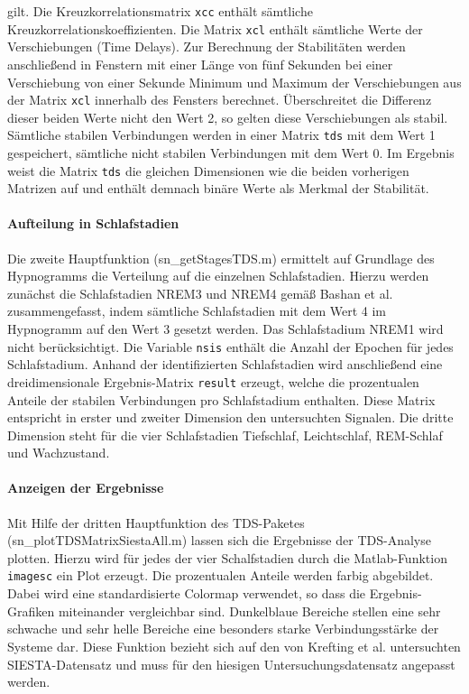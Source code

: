 gilt. Die Kreuzkorrelationsmatrix \texttt{xcc} enthält sämtliche Kreuzkorrelationskoeffizienten. Die Matrix \texttt{xcl} enthält sämtliche Werte der Verschiebungen (Time Delays). Zur Berechnung der Stabilitäten werden anschließend in Fenstern mit einer Länge von fünf Sekunden bei einer Verschiebung von einer Sekunde Minimum und Maximum der Verschiebungen aus der Matrix \texttt{xcl} innerhalb des Fensters berechnet. Überschreitet die Differenz dieser beiden Werte nicht den Wert 2, so gelten diese Verschiebungen als stabil. Sämtliche stabilen Verbindungen werden in einer Matrix \texttt{tds} mit dem Wert 1 gespeichert, sämtliche nicht stabilen Verbindungen mit dem Wert 0. Im Ergebnis weist die Matrix \texttt{tds} die gleichen Dimensionen wie die beiden vorherigen Matrizen auf und enthält demnach binäre Werte als Merkmal der Stabilität.

\paragraph{Aufteilung in Schlafstadien} Die zweite Hauptfunktion (sn\_getStagesTDS.m) ermittelt auf Grundlage des Hypnogramms die Verteilung auf die einzelnen Schlafstadien. Hierzu werden zunächst die Schlafstadien \acs{NREM}3 und \acs{NREM}4 gemäß Bashan et al. zusammengefasst, indem sämtliche Schlafstadien mit dem Wert 4 im Hypnogramm auf den Wert 3 gesetzt werden. Das Schlafstadium \acs{NREM}1 wird nicht berücksichtigt. Die Variable \texttt{nsis} enthält die Anzahl der Epochen für jedes Schlafstadium. Anhand der identifizierten Schlafstadien wird anschließend eine dreidimensionale Ergebnis-Matrix \texttt{result} erzeugt, welche die prozentualen Anteile der stabilen Verbindungen pro Schlafstadium enthalten. Diese Matrix entspricht in erster und zweiter Dimension den untersuchten Signalen. Die dritte Dimension steht für die vier Schlafstadien Tiefschlaf, Leichtschlaf, \acs{REM}-Schlaf und Wachzustand. 

\paragraph{Anzeigen der Ergebnisse} Mit Hilfe der dritten Hauptfunktion des \acs{TDS}-Paketes (sn\_plotTDSMatrixSiestaAll.m) lassen sich die Ergebnisse der \acs{TDS}-Analyse plotten. Hierzu wird für jedes der vier Schalfstadien durch die Matlab-Funktion \texttt{imagesc} ein Plot erzeugt. Die prozentualen Anteile werden farbig abgebildet. Dabei wird eine standardisierte Colormap verwendet, so dass die Ergebnis-Grafiken miteinander vergleichbar sind. Dunkelblaue Bereiche stellen eine sehr schwache und sehr helle Bereiche eine besonders starke Verbindungsstärke der Systeme dar. Diese Funktion bezieht sich auf den von Krefting et al. untersuchten SIESTA-Datensatz und muss für den hiesigen Untersuchungsdatensatz angepasst werden.


